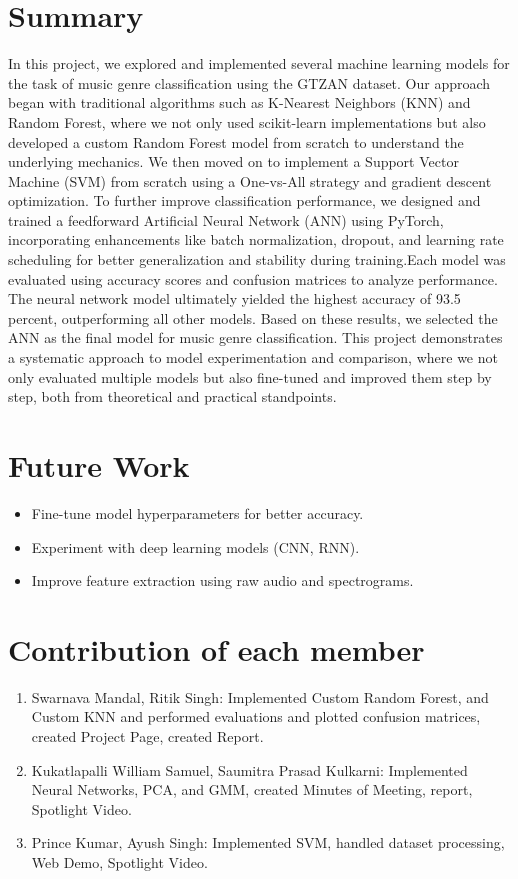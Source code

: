 \documentclass[a4paper]{article}
\theoremstyle{plain}
\theoremstyle{definition}
\begin{document}
\section{Summary}
\label{sec:summary}
In this project, we explored and implemented several machine learning models for the task of music genre classification using the GTZAN dataset. Our approach began with traditional algorithms such as K-Nearest Neighbors (KNN) and Random Forest, where we not only used scikit-learn implementations but also developed a custom Random Forest model from scratch to understand the underlying mechanics. We then moved on to implement a Support Vector Machine (SVM) from scratch using a One-vs-All strategy and gradient descent optimization. To further improve classification performance, we designed and trained a feedforward Artificial Neural Network (ANN) using PyTorch, incorporating enhancements like batch normalization, dropout, and learning rate scheduling for better generalization and stability during training.Each model was evaluated using accuracy scores and confusion matrices to analyze performance. The neural network model ultimately yielded the highest accuracy of 93.5 percent, outperforming all other models. Based on these results, we selected the ANN as the final model for music genre classification.
This project demonstrates a systematic approach to model experimentation and comparison, where we not only evaluated multiple models but also fine-tuned and improved them step by step, both from theoretical and practical standpoints.

\section{Future Work}
\begin{itemize}
    \item Fine-tune model hyperparameters for better accuracy.
    \item Experiment with deep learning models (CNN, RNN).
    \item Improve feature extraction using raw audio and spectrograms.
\end{itemize}



\appendix

\section{Contribution of each member}
\label{sec:contribution}
\begin{enumerate}
    \item Swarnava Mandal, Ritik Singh: Implemented Custom Random Forest, and Custom KNN and performed evaluations and plotted confusion matrices, created Project Page, created Report.
    \item Kukatlapalli William Samuel, Saumitra Prasad Kulkarni: Implemented Neural Networks, PCA, and GMM, created Minutes of Meeting, report, Spotlight Video.
    \item Prince Kumar, Ayush Singh: Implemented SVM, handled dataset processing, Web Demo, Spotlight Video.
\end{enumerate}
\end{document}
